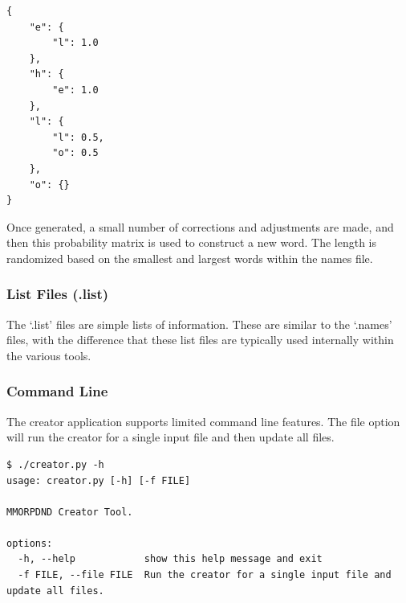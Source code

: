 \begin{lstlisting}
{
    "e": {
        "l": 1.0
    },
    "h": {
        "e": 1.0
    },
    "l": {
        "l": 0.5,
        "o": 0.5
    },
    "o": {}
}
\end{lstlisting}

Once generated, a small number of corrections and adjustments are made, and then this probability matrix is used to construct a new word. The length is randomized based on the smallest and largest words within the names file.





\subsubsection{List Files (.list) \label{section .list}}

The `.list' files are simple lists of information. These are similar to the `.names' files, with the difference that these list files are typically used internally within the various tools.













\subsubsection{Command Line}

The creator application supports limited command line features. The file option will run the creator for a single input file and then update all files.

\begin{lstlisting}
$ ./creator.py -h
usage: creator.py [-h] [-f FILE]

MMORPDND Creator Tool.

options:
  -h, --help            show this help message and exit
  -f FILE, --file FILE  Run the creator for a single input file and update all files.
\end{lstlisting}

















